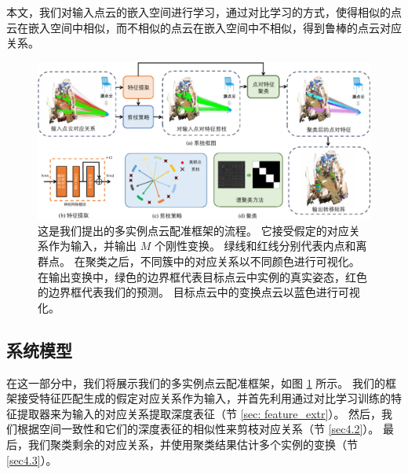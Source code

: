 本文，我们对输入点云的嵌入空间进行学习，通过对比学习的方式，使得相似的点云在嵌入空间中相似，而不相似的点云在嵌入空间中不相似，得到鲁棒的点云对应关系。

\begin{figure}[ht]
    \centering
    \includegraphics[width=1.0\textwidth]{images/pointcorr.pdf}
    \caption{
        这是我们提出的多实例点云配准框架的流程。
        它接受假定的对应关系作为输入，并输出 $M$ 个刚性变换。
        绿线和红线分别代表内点和离群点。
        在聚类之后，不同簇中的对应关系以不同颜色进行可视化。
        在输出变换中，绿色的边界框代表目标点云中实例的真实姿态，红色的边界框代表我们的预测。
        目标点云中的变换点云以蓝色进行可视化。      
    }
    \label{fig:point-pipeline}
  \end{figure}

\subsection{系统模型}
在这一部分中，我们将展示我们的多实例点云配准框架，如图 \ref{fig:point-pipeline} 所示。
我们的框架接受特征匹配生成的假定对应关系作为输入，并首先利用通过对比学习训练的特征提取器来为输入的对应关系提取深度表征（节 \ref{sec: feature_extr}）。
然后，我们根据空间一致性和它们的深度表征的相似性来剪枝对应关系（节 \ref{sec4.2}）。
最后，我们聚类剩余的对应关系，并使用聚类结果估计多个实例的变换（节 \ref{sec4.3}）。

